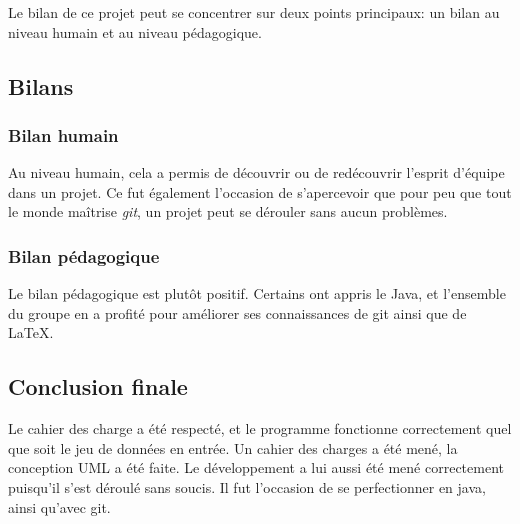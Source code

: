 \documentclass[12pt]{article}
\begin{document}
Le bilan de ce projet peut se concentrer sur deux points principaux: un bilan au niveau humain et au niveau pédagogique. 
\subsection{Bilans}
\subsubsection{Bilan humain}
Au niveau humain, cela a permis de découvrir ou de redécouvrir l'esprit d'équipe dans un projet. Ce fut également l'occasion de s'apercevoir que pour peu que tout le monde maîtrise \emph{git}, un projet peut se dérouler sans aucun problèmes.
\subsubsection{Bilan pédagogique}
Le bilan pédagogique est plutôt positif. Certains ont appris le Java, et l'ensemble du groupe en a profité pour améliorer ses connaissances de git ainsi que de \LaTeX.
\subsection{Conclusion finale}
Le cahier des charge a été respecté, et le programme fonctionne correctement quel que soit le jeu de données en entrée. Un cahier des charges a été mené, la conception UML a été faite. Le développement a lui aussi été mené correctement puisqu'il s'est déroulé sans soucis. Il fut l'occasion de se perfectionner en java, ainsi qu'avec git.
\end{document}
